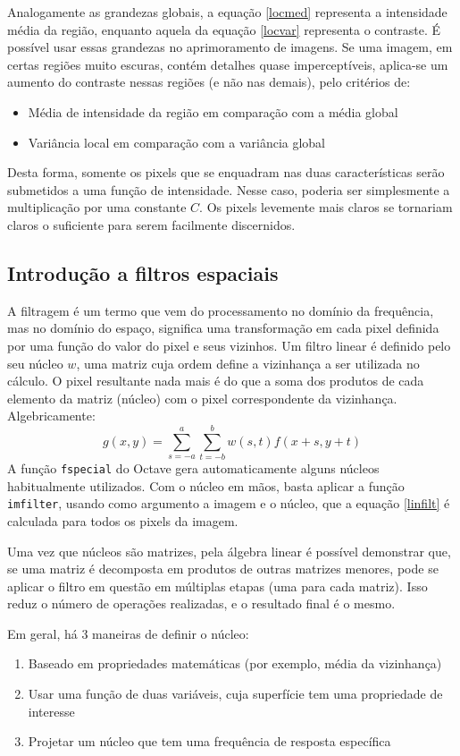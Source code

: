 \documentclass[a4paper,12pt,twoside]{article}
\begin{document}
Analogamente as grandezas globais, a equação \ref{locmed} representa a intensidade média da região, enquanto aquela da equação \ref{locvar} representa o contraste.
É possível usar essas grandezas no aprimoramento de imagens.
Se uma imagem, em certas regiões muito escuras, contém detalhes quase imperceptíveis, aplica-se um aumento do contraste nessas regiões (e não nas demais), pelo critérios
de:
\begin{itemize}
    \item{Média de intensidade da região em comparação com a média global}
    \item{Variância local em comparação com a variância global}
\end{itemize}
Desta forma, somente os pixels que se enquadram nas duas características serão submetidos a uma função de intensidade.
Nesse caso, poderia ser simplesmente a multiplicação por uma constante \(C\).
Os pixels levemente mais claros se tornariam claros o suficiente para serem facilmente discernidos.
\subsection{Introdução a filtros espaciais}
A filtragem é um termo que vem do processamento no domínio da frequência, mas no domínio do espaço, significa uma transformação em cada pixel definida por uma função do valor do pixel e seus vizinhos.
Um filtro linear é definido pelo seu núcleo \(w\),
uma matriz cuja ordem define a vizinhança a ser utilizada no cálculo.
O pixel resultante nada mais é do que a soma dos produtos de cada elemento da matriz (núcleo) com o pixel correspondente da vizinhança. Algebricamente:
\begin{equation}\label{linfilt}
    g(x,y) = \sum_{s=-a}^a\sum_{t=-b}^b{w(s,t)f(x+s,y+t)}
\end{equation}
A função \texttt{fspecial} do Octave gera automaticamente alguns núcleos habitualmente utilizados. Com o núcleo em mãos, basta aplicar a função \texttt{imfilter}, usando como argumento a imagem e o núcleo, que a equação \ref{linfilt} é calculada para todos os pixels da imagem.

Uma vez que núcleos são matrizes, pela álgebra linear é possível demonstrar que, se uma matriz é decomposta em produtos de outras matrizes menores, pode se aplicar o filtro em questão em múltiplas etapas (uma para cada matriz).
Isso reduz o número de operações realizadas, e o resultado final é o mesmo.

Em geral, há 3 maneiras de definir o núcleo:
\begin{enumerate}
    \item{Baseado em propriedades matemáticas (por exemplo, média da vizinhança)}
    \item{Usar uma função de duas variáveis, cuja superfície tem uma propriedade de interesse}
    \item{Projetar um núcleo que tem uma frequência de resposta específica}
\end{enumerate}
\end{document}

